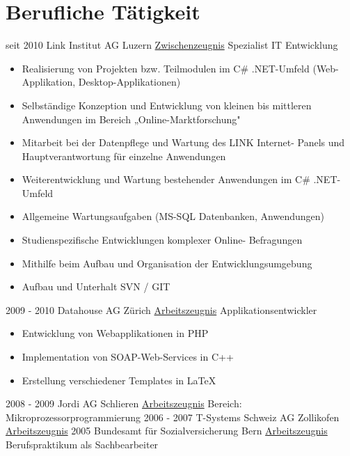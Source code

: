 \documentclass[a4paper]{twentysecondcv} %
\begin{document}


\makeprofile %
\hypertarget{work_back}{}
\section{Berufliche Tätigkeit}
\begin{twenty}
	\twentyitem
    	{seit 2010}
        {}
        {Link Institut AG \textnormal{Luzern}}
        {\hyperlink{link2}{\textcolor{pblue}{Zwischenzeugnis}}}
        {Spezialist IT Entwicklung}
        {\begin{itemize}
\item Realisierung von Projekten bzw. Teilmodulen im C\# .NET-Umfeld
(Web-Applikation, Desktop-Applikationen)
\item Selbständige Konzeption und Entwicklung von kleinen bis
mittleren Anwendungen im Bereich „Online-Marktforschung"
\item Mitarbeit bei der Datenpflege und Wartung des LINK Internet-
Panels und Hauptverantwortung für einzelne Anwendungen
\item Weiterentwicklung und Wartung bestehender Anwendungen im
C\# .NET-Umfeld
\item Allgemeine Wartungsaufgaben (MS-SQL Datenbanken,
Anwendungen)
\item Studienspezifische Entwicklungen komplexer Online-
Befragungen
\item Mithilfe beim Aufbau und Organisation der
Entwicklungsumgebung
\item Aufbau und Unterhalt SVN \// GIT
	\end{itemize}}		
	\twentyitem
    	{}
        {}
        {}
        {}
        {}
        {}
	\twentyitem
    	{2009 - 2010}
        {}
        {Datahouse AG \textnormal{Zürich}}
        {\hyperlink{datahouse}{\textcolor{pblue}{Arbeitszeugnis}}}
        {Applikationsentwickler}
        {
		\begin{itemize}
		\item Entwicklung von Webapplikationen in PHP
		\item Implementation von SOAP-Web-Services in C++
		\item Erstellung verschiedener Templates in \LaTeX
		\end{itemize}
	}	
	\twentyitem
    	{}
        {}
        {}
        {}
        {}
        {}
	\twentyitem
    	{2008 - 2009}
        {}
        {Jordi AG \textnormal{Schlieren}}
        {\hyperlink{jordi}{\textcolor{pblue}{Arbeitszeugnis}}}
        {Bereich: Mikroprozessorprogrammierung}
        {}
	\twentyitem
    	{2006 - 2007}
        {}
        {T-Systems Schweiz AG \textnormal{Zollikofen}}
        {\hyperlink{tsystems}{\textcolor{pblue}{Arbeitszeugnis}}}
        {}
        {}
	\twentyitem
    	{2005}
        {}
        {Bundesamt für Sozialversicherung \textnormal{Bern}}
        {\hyperlink{bsv}{\textcolor{pblue}{Arbeitszeugnis}}}
        {Berufspraktikum als Sachbearbeiter}
        {}


\end{twenty}
\end{document}
